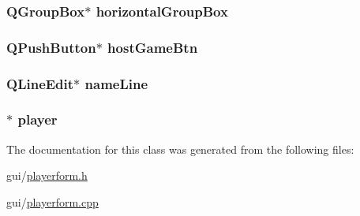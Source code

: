 \subsubsection[{\texorpdfstring{horizontal\+Group\+Box}{horizontalGroupBox}}]{\setlength{\rightskip}{0pt plus 5cm}Q\+Group\+Box$\ast$ horizontal\+Group\+Box\hspace{0.3cm}{\ttfamily [private]}}\hypertarget{classGUI_1_1PlayerForm_af458ad810116b1284b175480c1a3640e}{}\label{classGUI_1_1PlayerForm_af458ad810116b1284b175480c1a3640e}
\subsubsection[{\texorpdfstring{host\+Game\+Btn}{hostGameBtn}}]{\setlength{\rightskip}{0pt plus 5cm}Q\+Push\+Button$\ast$ host\+Game\+Btn\hspace{0.3cm}{\ttfamily [private]}}\hypertarget{classGUI_1_1PlayerForm_a2ae9cb3ec8281a3b0b35124cc17c3f3f}{}\label{classGUI_1_1PlayerForm_a2ae9cb3ec8281a3b0b35124cc17c3f3f}
\subsubsection[{\texorpdfstring{name\+Line}{nameLine}}]{\setlength{\rightskip}{0pt plus 5cm}Q\+Line\+Edit$\ast$ name\+Line\hspace{0.3cm}{\ttfamily [private]}}\hypertarget{classGUI_1_1PlayerForm_a8faa8074b2f9d7f9f4471b1ad61b4c65}{}\label{classGUI_1_1PlayerForm_a8faa8074b2f9d7f9f4471b1ad61b4c65}
\subsubsection[{\texorpdfstring{player}{player}}]{$\ast$ player\hspace{0.3cm}{\ttfamily [private]}}\hypertarget{classGUI_1_1PlayerForm_a96781128d3743da3d17e0fdd91afba7b}{}\label{classGUI_1_1PlayerForm_a96781128d3743da3d17e0fdd91afba7b}


The documentation for this class was generated from the following files\+:\begin{DoxyCompactItemize}
\item 
gui/\hyperlink{playerform_8h}{playerform.\+h}\item 
gui/\hyperlink{playerform_8cpp}{playerform.\+cpp}\end{DoxyCompactItemize}
